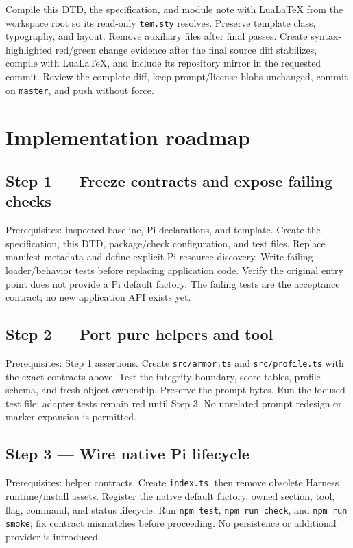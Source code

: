 \documentclass[10pt]{ltjsarticle}
\begin{document}
Compile this DTD, the specification, and module note with LuaLaTeX from the
workspace root so its read-only \texttt{tem.sty} resolves. Preserve template
class, typography, and layout. Remove auxiliary files after final passes.
Create syntax-highlighted red/green change evidence after the final source
diff stabilizes, compile with LuaLaTeX, and include its repository mirror in
the requested commit. Review the complete diff, keep prompt/license blobs
unchanged, commit on \texttt{master}, and push without force.

\section{Implementation roadmap}
\subsection*{Step 1 --- Freeze contracts and expose failing checks}
Prerequisites: inspected baseline, Pi declarations, and template. Create the
specification, this DTD, package/check configuration, and test files. Replace
manifest metadata and define explicit Pi resource discovery. Write failing
loader/behavior tests before replacing application code. Verify the original
entry point does not provide a Pi default factory. The failing tests are the
acceptance contract; no new application API exists yet.

\subsection*{Step 2 --- Port pure helpers and tool}
Prerequisites: Step 1 assertions. Create \texttt{src/armor.ts} and
\texttt{src/profile.ts} with the exact contracts above. Test the integrity
boundary, score tables, profile schema, and fresh-object ownership. Preserve
the prompt bytes. Run the focused test file; adapter tests remain red until
Step 3. No unrelated prompt redesign or marker expansion is permitted.

\subsection*{Step 3 --- Wire native Pi lifecycle}
Prerequisites: helper contracts. Create \texttt{index.ts}, then remove obsolete
Harness runtime/install assets. Register the native default factory, owned
section, tool, flag, command, and status lifecycle. Run \texttt{npm test},
\texttt{npm run check}, and \texttt{npm run smoke}; fix contract mismatches
before proceeding. No persistence or additional provider is introduced.
\end{document}
